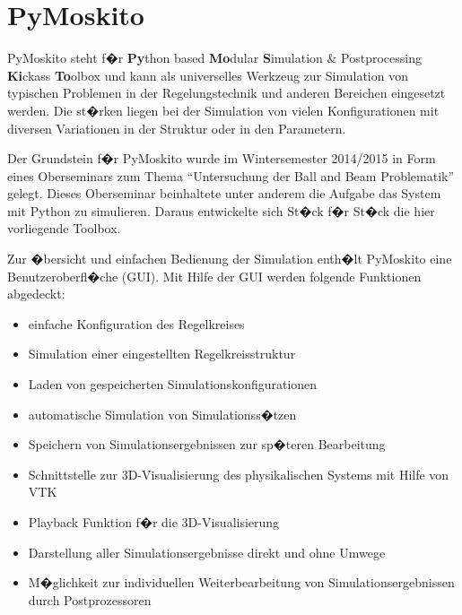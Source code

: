 \documentclass[a4paper]{scrartcl}
\begin{document}
\section*{PyMoskito}

PyMoskito steht f�r \textbf{Py}thon based \textbf{Mo}dular \textbf{S}imulation \& Postprocessing \textbf{Ki}ckass \textbf{To}olbox und kann als universelles Werkzeug zur Simulation von typischen Problemen in der Regelungstechnik und anderen Bereichen eingesetzt werden. Die st�rken liegen bei der Simulation von vielen Konfigurationen mit diversen Variationen in der Struktur oder in den Parametern.


Der Grundstein f�r PyMoskito wurde im Wintersemester 2014/2015 in Form eines Oberseminars zum Thema "`Untersuchung der Ball and Beam Problematik"' gelegt. Dieses Oberseminar beinhaltete unter anderem die Aufgabe das System mit Python zu simulieren. Daraus entwickelte sich St�ck f�r St�ck die hier vorliegende Toolbox.


Zur �bersicht und einfachen Bedienung der Simulation enth�lt PyMoskito eine Benutzeroberfl�che (GUI). Mit Hilfe der GUI werden folgende Funktionen abgedeckt:
\begin{itemize}
	\item einfache Konfiguration des Regelkreises
	\item Simulation einer eingestellten Regelkreisstruktur
	\item Laden von gespeicherten Simulationskonfigurationen
	\item automatische Simulation von Simulationss�tzen
	\item Speichern von Simulationsergebnissen zur sp�teren Bearbeitung
	\item Schnittstelle zur 3D-Visualisierung des physikalischen Systems mit Hilfe von VTK
	\item Playback Funktion f�r die 3D-Visualisierung
	\item Darstellung aller Simulationsergebnisse direkt und ohne Umwege
	\item M�glichkeit zur individuellen Weiterbearbeitung von Simulationsergebnissen durch Postprozessoren
\end{itemize}
\end{document}
